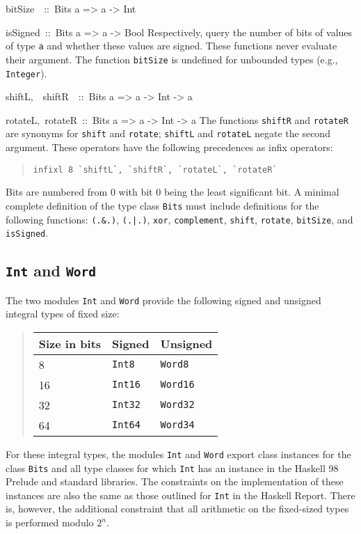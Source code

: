 \documentclass[a4paper,twoside]{article}
\makeatletter
\newcommand{\code}[1]{\texttt{#1}}      %
\newenvironment{codedesc}{%
  \list{}{\labelwidth\z@
    \let\makelabel\codedesclabel}
  }{%
  \endlist
  }
\newcommand*{\codedesclabel}[1]{%
  \hspace{-\leftmargin}
  \parbox[b]{\labelwidth}{\makebox[0pt][l]{\code{#1}}\\}\hfil\relax
  }
\newcommand{\combineitems}{\vspace*{-\itemsep}\vspace*{-\parsep}\vspace*{-1em}}
\makeatother
\begin{document}
\begin{codedesc}
\item[bitSize~~::\ Bits a => a -> Int]
\item[isSigned~::\ Bits a => a -> Bool]\combineitems Respectively, query the
  number of bits of values of type \code{a} and whether these values are
  signed.  These functions never evaluate their argument.  The function
  \code{bitSize} is undefined for unbounded types (e.g., \code{Integer}).

\item[shiftL,~~shiftR~~::\ Bits a => a -> Int -> a]
\item[rotateL,~rotateR~::\ Bits a => a -> Int -> a]\combineitems The functions
  \code{shiftR} and \code{rotateR} are synonyms for \code{shift} and
  \code{rotate}; \code{shiftL} and \code{rotateL} negate the second argument.
  These operators have the following precedences as infix operators:
  \begin{quote}
\begin{verbatim}
infixl 8 `shiftL`, `shiftR`, `rotateL`, `rotateR`
\end{verbatim}
  \end{quote}

\end{codedesc}
%
Bits are numbered from 0 with bit 0 being the least significant bit.  A
minimal complete definition of the type class \code{Bits} must include
definitions for the following functions: \code{(.\&.)}, \code{(.|.)},
\code{xor}, \code{complement}, \code{shift}, \code{rotate}, \code{bitSize},
and \code{isSigned}. 

\subsection{\code{Int} and \code{Word}}
\label{sec:Int-Word}

The two modules \code{Int} and \code{Word} provide the following signed and
unsigned integral types of fixed size:
%
\begin{quote}
  \begin{tabular}{|l|l|l|}
    \hline
    Size in bits & Signed       & Unsigned\\\hline\hline
    8            & \code{Int8}  & \code{Word8}\\
    16           & \code{Int16} & \code{Word16}\\
    32           & \code{Int32} & \code{Word32}\\
    64           & \code{Int64} & \code{Word34}\\
    \hline
  \end{tabular}
\end{quote}
%
For these integral types, the modules \code{Int} and \code{Word} export class
instances for the class \code{Bits} and all type classes for which \code{Int}
has an instance in the Haskell 98 Prelude and standard libraries.  The
constraints on the implementation of these instances are also the same as
those outlined for \code{Int} in the Haskell Report.  There is, however, the
additional constraint that all arithmetic on the fixed-sized types is
performed modulo \(2^n\).
\end{document}

